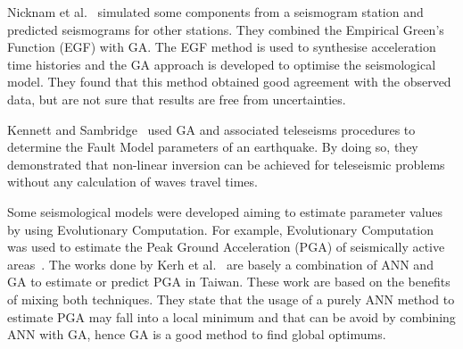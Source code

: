 Nicknam et al.~\cite{Nicknam2010} simulated some components from a seismogram station and predicted seismograms for other stations. They combined the Empirical Green’s Function (EGF) with GA. The EGF method is used to synthesise acceleration time histories and the GA approach is developed to optimise the seismological model. They found that this method obtained good agreement with the observed data, but are not sure that results are free from uncertainties.%

Kennett and Sambridge~\cite{Kennett1992} used GA and associated teleseisms procedures to determine the Fault Model parameters of an earthquake. By doing so, they demonstrated that non-linear inversion can be achieved for teleseismic problems without any calculation of waves travel times. %

Some seismological models were developed aiming to estimate parameter values by using Evolutionary Computation. For example, Evolutionary Computation was used to estimate the Peak Ground Acceleration (PGA) of seismically active areas~\cite{Kermani2009,Cabalar2009,Kerh2010,Kerh2015}. 
The works done by Kerh et al.~\cite{Kerh2010, Kerh2015} are basely a combination of ANN and GA to estimate or predict PGA in Taiwan. These work are based on the benefits of mixing both techniques. They state that the usage of a purely ANN method to estimate PGA may fall into a local minimum and that can be avoid by combining ANN with GA, hence GA is a good method to find global optimums.

 

